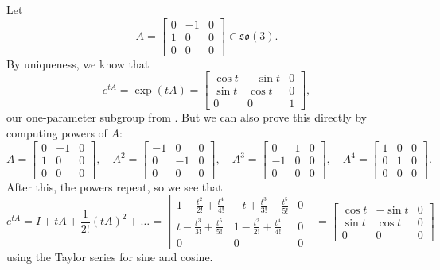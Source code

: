 \begin{example}
	Let 
	\[
		A = \begin{bmatrix} 0 & -1 & 0 \\ 1 & 0 & 0 \\ 0 & 0 & 0 \end{bmatrix} \in \mathfrak{so}(3).
	\]
	By uniqueness, we know that 
	\[
		e^{tA} = \exp(tA) = \begin{bmatrix} \cos t & -\sin t & 0 \\ \sin t & \cos t & 0 \\ 0 & 0 & 1 \end{bmatrix},
	\]
	our one-parameter subgroup from . But we can also prove this directly by computing powers of $A$:
	\[
		A =  \begin{bmatrix} 0 & -1 & 0 \\ 1 & 0 & 0 \\ 0 & 0 & 0 \end{bmatrix}, \quad A^2 =  \begin{bmatrix} -1 & 0 & 0 \\ 0 & -1 & 0 \\ 0 & 0 & 0 \end{bmatrix}, \quad A^3 =  \begin{bmatrix} 0 & 1 & 0 \\ -1 & 0 & 0 \\ 0 & 0 & 0 \end{bmatrix}, \quad A^4 =  \begin{bmatrix} 1 & 0 & 0 \\ 0 & 1 & 0 \\ 0 & 0 & 0 \end{bmatrix}.
	\]
	After this, the powers repeat, so we see that
	\[
		e^{tA} = I + tA + \frac{1}{2!} (tA)^2 + \dots = \begin{bmatrix} 1 - \frac{t^2}{2!} + \frac{t^4}{4!} & -t + \frac{t^3}{3!} - \frac{t^5}{5!} & 0 \\ t - \frac{t^3}{3!} + \frac{t^5}{5!} & 1 - \frac{t^2}{2!} + \frac{t^4}{4!} & 0 \\ 0 & 0 & 0 \end{bmatrix} = \begin{bmatrix} \cos t & -\sin t & 0 \\ \sin t & \cos t & 0 \\ 0 & 0 & 0 \end{bmatrix}
	\]
	using the Taylor series for sine and cosine.
\end{example}

